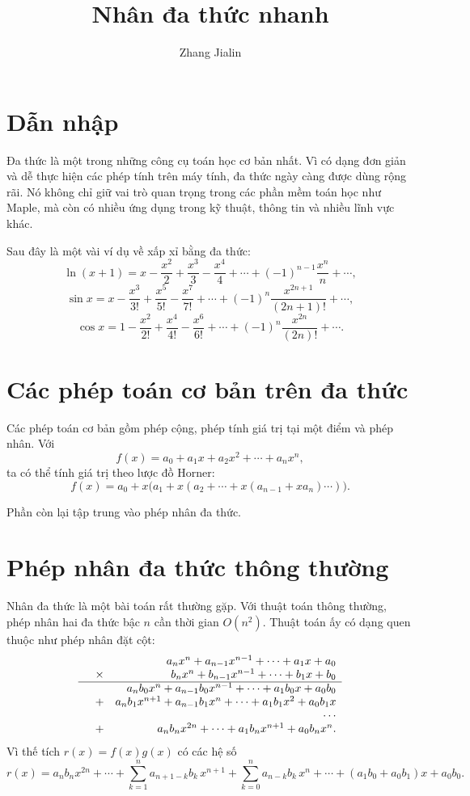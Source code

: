 \documentclass[11pt]{article}
\title{Nhân đa thức nhanh}
\author{Zhang Jialin}
\date{}
\begin{document}
\maketitle


\tableofcontents

\section{Dẫn nhập}

Đa thức là một trong những công cụ toán học cơ bản nhất. Vì có dạng đơn giản
và dễ thực hiện các phép tính trên máy tính, đa thức ngày càng được dùng rộng
rãi. Nó không chỉ giữ vai trò quan trọng trong các phần mềm toán học như
Maple, mà còn có nhiều ứng dụng trong kỹ thuật, thông tin và nhiều lĩnh vực
khác.

Sau đây là một vài ví dụ về xấp xỉ bằng đa thức:
\[
  \ln(x+1)=x-\frac{x^2}{2}+\frac{x^3}{3}-\frac{x^4}{4}
    +\cdots+(-1)^{n-1}\frac{x^n}{n}+\cdots,
\]
\[
  \sin x=x-\frac{x^3}{3!}+\frac{x^5}{5!}-\frac{x^7}{7!}
    +\cdots+(-1)^n\frac{x^{2n+1}}{(2n+1)!}+\cdots,
\]
\[
  \cos x=1-\frac{x^2}{2!}+\frac{x^4}{4!}-\frac{x^6}{6!}
    +\cdots+(-1)^n\frac{x^{2n}}{(2n)!}+\cdots.
\]

\section{Các phép toán cơ bản trên đa thức}

Các phép toán cơ bản gồm phép cộng, phép tính giá trị tại một điểm và phép
nhân. Với
\[
  f(x)=a_0+a_1x+a_2x^2+\cdots+a_nx^n,
\]
ta có thể tính giá trị theo lược đồ Horner:
\[
  f(x)=a_0+x\bigl(a_1+x(a_2+\cdots+x(a_{n-1}+xa_n)\cdots)\bigr).
\]

Phần còn lại tập trung vào phép nhân đa thức.

\section{Phép nhân đa thức thông thường}

Nhân đa thức là một bài toán rất thường gặp. Với thuật toán thông thường,
phép nhân hai đa thức bậc \(n\) cần thời gian \(O(n^2)\). Thuật toán ấy có
dạng quen thuộc như phép nhân đặt cột:
\[
\begin{array}{rrrrr}
&& a_nx^n+a_{n-1}x^{n-1}+\cdots+a_1x+a_0\\
&\times& b_nx^n+b_{n-1}x^{n-1}+\cdots+b_1x+b_0\\ \hline
&& a_nb_0x^n+a_{n-1}b_0x^{n-1}+\cdots+a_1b_0x+a_0b_0\\
&+& a_nb_1x^{n+1}+a_{n-1}b_1x^n+\cdots+a_1b_1x^2+a_0b_1x\\
&& \cdots\\
&+& a_nb_nx^{2n}+\cdots+a_1b_nx^{n+1}+a_0b_nx^n.
\end{array}
\]
Vì thế tích \(r(x)=f(x)g(x)\) có các hệ số
\[
  r(x)=a_nb_nx^{2n}
  +\cdots+
  \sum_{k=1}^{n} a_{n+1-k}b_k\,x^{n+1}
  +\sum_{k=0}^{n} a_{n-k}b_k\,x^n
  +\cdots+(a_1b_0+a_0b_1)x+a_0b_0.
\]
\end{document}
